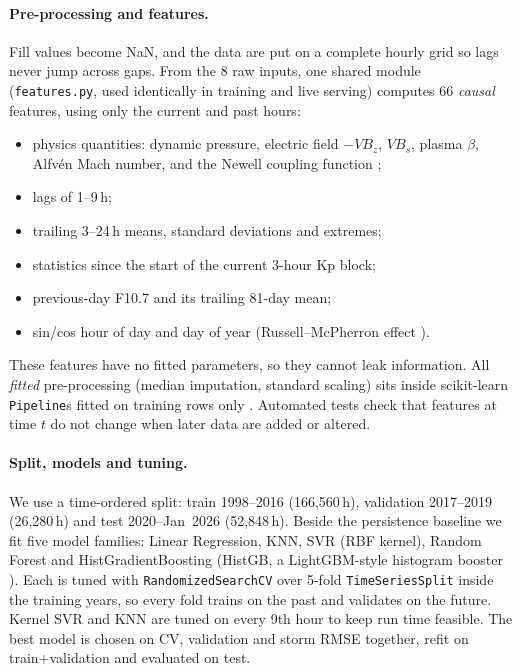 \documentclass[11pt,a4paper]{article}
\newcommand{\code}[1]{\texttt{\small #1}}
\begin{document}
\paragraph{Pre-processing and features.} Fill values become NaN, and the data are put on a complete hourly grid so
lags never jump across gaps. From the 8 raw inputs, one shared module (\code{features.py}, used identically in
training and live serving) computes 66 \emph{causal} features, using only the current and past hours:
\begin{itemize}
\item physics quantities: dynamic pressure, electric field $-VB_z$, $VB_s$, plasma $\beta$, Alfv\'en Mach number,
and the Newell coupling function \cite{newell2007};
\item lags of 1--9\,h;
\item trailing 3--24\,h means, standard deviations and extremes;
\item statistics since the start of the current 3-hour Kp block;
\item previous-day F10.7 and its trailing 81-day mean;
\item sin/cos hour of day and day of year (Russell--McPherron effect \cite{russell1973}).
\end{itemize}
These features have no fitted parameters, so they cannot leak information. All \emph{fitted} pre-processing (median
imputation, standard scaling) sits inside scikit-learn \code{Pipeline}s fitted on training rows only
\cite{pedregosa2011}. Automated tests check that features at time $t$ do not change when later data are added or
altered.

\paragraph{Split, models and tuning.} We use a time-ordered split: train 1998--2016 (166{,}560\,h), validation
2017--2019 (26{,}280\,h) and test 2020--Jan~2026 (52{,}848\,h). Beside the persistence baseline we fit five model
families: Linear Regression, KNN, SVR (RBF kernel), Random Forest and HistGradientBoosting (HistGB, a
LightGBM-style histogram booster \cite{ke2017}). Each is tuned with \code{RandomizedSearchCV} over 5-fold
\code{TimeSeriesSplit} inside the training years, so every fold trains on the past and validates on the future.
Kernel SVR and KNN are tuned on every 9th hour to keep run time feasible. The best model is chosen on CV, validation
and storm RMSE together, refit on train+validation and evaluated on test.
\end{document}
